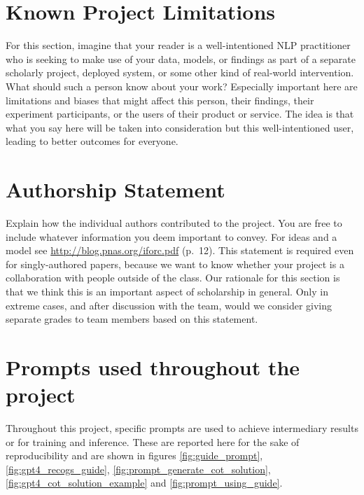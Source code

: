 \documentclass[11pt]{article}
\begin{document}
    \section*{Known Project Limitations}

    For this section, imagine that your reader is a well-intentioned NLP practitioner who is seeking to make use of your data, models, or findings as part of a separate scholarly project, deployed system, or some other kind of real-world intervention. What should such a person know about your work? Especially important here are limitations and biases that might affect this person, their findings, their experiment participants, or the users of their product or service. The idea is that what you say here will be taken into consideration but this well-intentioned user, leading to better outcomes for everyone.


    \section*{Authorship Statement}

    Explain how the individual authors contributed to the
    project. You are free to include whatever information you deem important to convey. For ideas and a model see \url{http://blog.pnas.org/iforc.pdf} (p.~12).
    This statement is required even for singly-authored papers, because we want to know whether your project is a collaboration with people outside of the class. Our rationale for this section is that we think this is an important aspect of scholarship in general. Only in extreme cases, and after discussion with the team, would we consider giving separate grades to team members based on this statement.

    

    \appendix


    \section{Prompts used throughout the project}\label{sec:appendix}
    Throughout this project, specific prompts are used to achieve intermediary results or for training and inference.
    These are reported here for the sake of reproducibility and are shown in figures \ref{fig:guide_prompt},
    \ref{fig:gpt4_recogs_guide}, \ref{fig:prompt_generate_cot_solution}, \ref{fig:gpt4_cot_solution_example} and \ref{fig:prompt_using_guide}.
\end{document}
